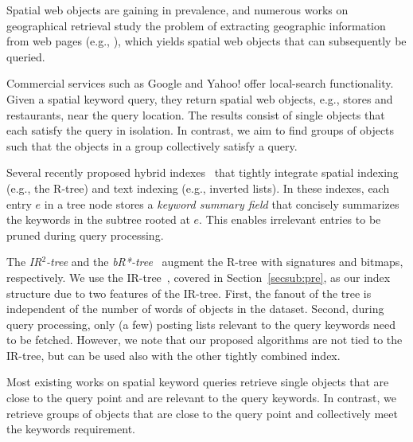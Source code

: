 \documentclass{sig-alternate}
\begin{document}
Spatial web objects are gaining in prevalence, and numerous works on
geographical retrieval study the problem of extracting geographic
information from web pages (e.g., \cite{Amitay04, Ding00,
  McCurley01}), which yields spatial web objects that can subsequently
be queried.

Commercial services such as Google and Yahoo! offer local-search
functionality. Given a spatial keyword query, they return spatial
web objects, e.g., stores and restaurants, near the query location.
The results consist of single objects that each satisfy the query in
isolation.
%
In contrast, we aim to find groups of objects such that the objects
in a group collectively satisfy a query.

Several recently proposed hybrid
indexes~\cite{Felipe08,icde09,Zhang10,vldb09,CaoCJ10} that tightly integrate
spatial indexing (e.g., the R-tree) and text indexing (e.g.,
inverted lists). In these indexes, each entry $e$ in a tree node
stores a {\em keyword summary field} that concisely summarizes the keywords in the
subtree rooted at $e$. This enables irrelevant entries to be pruned
during query processing.

The \textit{IR$^2$-tree} and the \textit{bR*-tree}~\cite{icde09}
augment the R-tree with signatures and bitmaps, respectively.
%
%
%
We use the IR-tree~\cite{vldb09}, covered in
Section~\ref{secsub:pre}, as our index structure due to two
features of the IR-tree. First, the fanout of the tree is independent of the number
of words of objects in the dataset. Second, during query processing,
only (a few) posting lists relevant to the query keywords need to be
fetched.
%
However, we note that our proposed algorithms are not tied to the
IR-tree, but can be used also with the other tightly combined index.



Most existing works on spatial keyword queries retrieve
single objects that are close to the query point and are relevant to
the query keywords. In contrast, we retrieve groups of objects that
are close to the query point and collectively meet the keywords
requirement.
\end{document}
